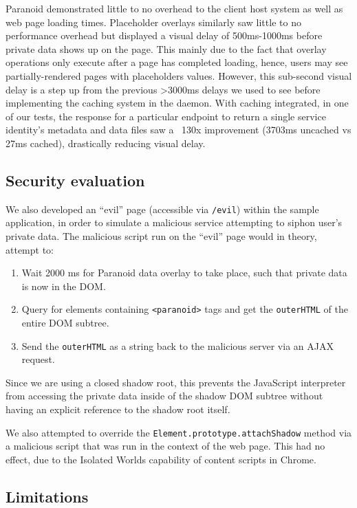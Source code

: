 \documentclass[letterpaper,twocolumn,10pt]{article}
\begin{document}
Paranoid demonstrated little to no overhead to the client host system as well as web page loading times. Placeholder overlays similarly saw little to no performance overhead but displayed a visual delay of 500ms-1000ms before private data shows up on the page. This mainly due to the fact that overlay operations only execute after a page has completed loading, hence, users may see partially-rendered pages with placeholders values. However, this sub-second visual delay is a step up from the previous >3000ms delays we used to see before implementing the caching system in the daemon. With caching integrated, in one of our tests, the response for a particular endpoint to return a single service identity's metadata and data files saw a ~130x improvement (3703ms uncached vs 27ms cached), drastically reducing visual delay.

\subsection{Security evaluation}

We also developed an ``evil'' page (accessible via \texttt{/evil}) within the sample application, in order to simulate a malicious service attempting to siphon user's private data. The malicious script run on the ``evil'' page would in theory, attempt to:

\begin{enumerate}
    \item Wait 2000 ms for Paranoid data overlay to take place, such that private data is now in the DOM.
    \item Query for elements containing \texttt{<paranoid>} tags and get the \texttt{outerHTML} of the entire DOM subtree.
    \item Send the \texttt{outerHTML} as a string back to the malicious server via an AJAX request.
\end{enumerate}

Since we are using a closed shadow root, this prevents the JavaScript interpreter from accessing the private data inside of the shadow DOM subtree without having an explicit reference to the shadow root itself.

We also attempted to override the \texttt{Element.prototype.attachShadow} method via a malicious script that was run in the context of the web page. This had no effect, due to the Isolated Worlds capability of content scripts in Chrome.

\subsection{Limitations}
\end{document}
